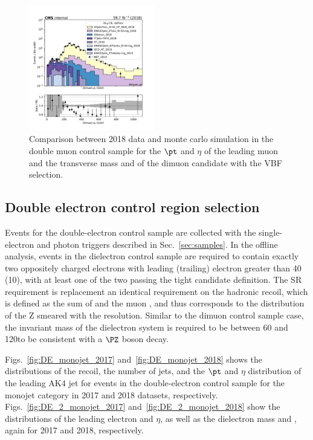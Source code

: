 {\begin{figure}[htbp]
\begin{center}
        \includegraphics[width=0.49\textwidth]{fig/datamc/cr_2m_vbf/cr_2m_vbf_dimuon_pt_losf_2018.pdf}
    \end{center}
    \caption{Comparison between 2018 data and monte carlo simulation in the double muon control sample for
    the $\pt$ and $\eta$ of the leading muon and the transverse mass and \pt of the dimuon candidate with the VBF selection.}
    \label{fig:DM_2_vbfhinv_2018}
\end{figure}

\newpage

\subsection{Double electron control region selection}
\label{sec:selection_cr_2e}
Events for the double-electron control sample are collected with the single-electron and photon triggers described in Sec.~\ref{sec:samples}. In the offline analysis, events in the dielectron control sample are required to contain exactly two oppositely charged electrons with leading (trailing) electron \pt greater than 40 (10)\GeV, with at least one of the two passing the tight candidate definition. The SR \ptmiss requirement is replacement an identical requirement on the hadronic recoil, which is defined as the sum of \ptvecmiss and the muon \vpt, and thus corresponds to the distribution of the Z \pt smeared with the \ptmiss resolution. Similar to the dimuon control sample case, the invariant mass of the dielectron system is required to be between 60 and 120\GeV to be consistent with a $\PZ$ boson decay.

Figs.~\ref{fig:DE_monojet_2017} and~\ref{fig:DE_monojet_2018} shows the distributions of the recoil, the number of jets, and the $\pt$ and $\eta$ distribution of the leading AK4  jet
for events in the double-electron control sample for the monojet category in 2017 and 2018 datasets, respectively. Figs.~\ref{fig:DE_2_monojet_2017} and~\ref{fig:DE_2_monojet_2018} show the distributions of the leading electron \pt and $\eta$, as well as the dielectron mass and \pt, again for 2017 and 2018, respectively.

}
